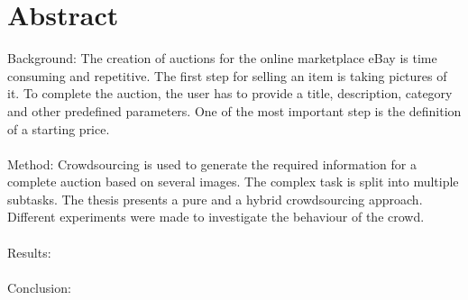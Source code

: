 \chapter*{Abstract}
\thispagestyle{empty}
Background: The creation of auctions for the online marketplace eBay is time consuming and repetitive. The first step for selling an item is taking pictures of it. To complete the auction, the user has to provide a title, description, category and other predefined parameters. One of the most important step is the definition of a starting price.\\\\
Method: Crowdsourcing is used to generate the required information for a complete auction based on several images. The complex task is split into multiple subtasks. The thesis presents a pure and a hybrid crowdsourcing approach. Different experiments were made to investigate the behaviour of the crowd.\\\\
Results:\\\\
Conclusion: \\\\
\clearpage
